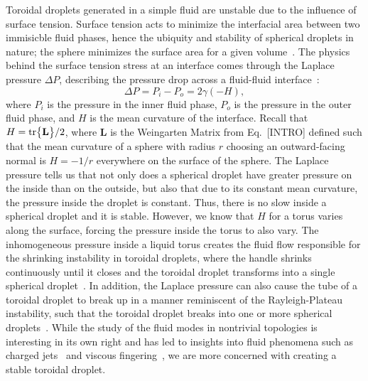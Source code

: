 Toroidal droplets generated in a simple fluid are unstable due to the influence of surface tension.
Surface tension acts to minimize the interfacial area between two immisicble fluid phases, hence the ubiquity and stability of spherical droplets in nature; the sphere minimizes the surface area for a given volume~\cite{RN178}.
The physics behind the surface tension stress at an interface comes through the Laplace pressure $\Delta P$, describing the pressure drop across a fluid-fluid interface~\cite{RN178}:
\begin{equation}\label{e:3-LapPres}
  \Delta P = P_i - P_o = 2 \gamma (- H),
\end{equation}
where $P_i$ is the pressure in the inner fluid phase, $P_o$ is the pressure in the outer fluid phase, and $H$ is the mean curvature of the interface.
Recall that $H = \textup{tr}\big \{ \mathbf{L} \big \}/2$, where $\mathbf{L}$ is the Weingarten Matrix from Eq.~[INTRO] defined such that the mean curvature of a sphere with radius $r$ choosing an outward-facing normal is $H = -1/r$ everywhere on the surface of the sphere.
The Laplace pressure tells us that not only does a spherical droplet have greater pressure on the inside than on the outside, but also that due to its constant mean curvature, the pressure inside the droplet is constant.
Thus, there is no slow inside a spherical droplet and it is stable.
However, we know that $H$ for a torus varies along the surface, forcing the pressure inside the torus to also vary.
The inhomogeneous pressure inside a liquid torus creates the fluid flow responsible for the shrinking instability in toroidal droplets, where the handle shrinks continuously until it closes and the toroidal droplet transforms into a single spherical droplet~\cite{RN29,RN255}.
In addition, the Laplace pressure can also cause the tube of a toroidal droplet to break up in a manner reminiscent of the Rayleigh-Plateau instability, such that the toroidal droplet breaks into one or more spherical droplets~\cite{RN29,RN256}.
While the study of the fluid modes in nontrivial topologies is interesting in its own right and has led to insights into fluid phenomena such as charged jets~\cite{RN256} and viscous fingering~\cite{RN254}, we are more concerned with creating a stable toroidal droplet.

